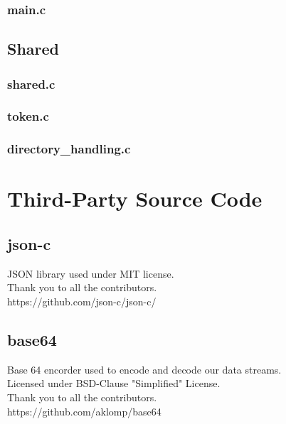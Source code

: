 \documentclass{article}
\begin{document}
    \subsubsection{main.c}
	
\subsection{Shared}
    \subsubsection{shared.c}
	
	\subsubsection{token.c}
	
	\subsubsection{directory\_handling.c}
	

\section{Third-Party Source Code}
\subsection{json-c}
JSON library used under MIT license.\\
Thank you to all the contributors.\\
https://github.com/json-c/json-c/\\
\subsection{base64}
Base 64 encorder used to encode and decode our data streams.\\
Licensed under BSD-Clause "Simplified" License.\\
Thank you to all the contributors.\\
https://github.com/aklomp/base64\\
\end{document}
